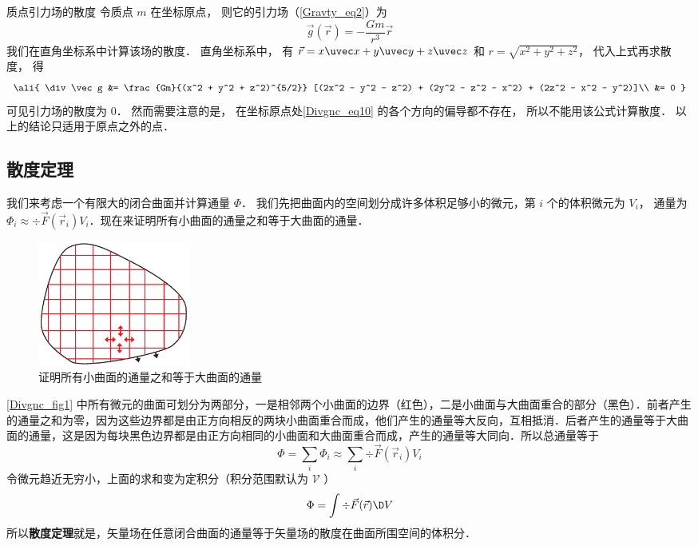 \begin{exam}{质点引力场的散度}
令质点 $m$ 在坐标原点， 则它的引力场（\autoref{Gravty_eq2}）为
\begin{equation}\label{Divgnc_eq10}
\vec g(\vec r) = -\frac{Gm}{r^3}\vec r
\end{equation}
我们在直角坐标系中计算该场的散度． 直角坐标系中， 有 $\vec r = x\uvec x + y\uvec y + z\uvec z$ 和 $r = \sqrt{x^2 + y^2 + z^2}$， 代入上式再求散度， 得
\begin{equation}\ali{
\div \vec g &= \frac{Gm}{(x^2 + y^2 + z^2)^{5/2}} [(2x^2 - y^2 - z^2) + (2y^2 - z^2 - x^2) + (2z^2 - x^2 - y^2)]\\
&= 0
}\end{equation}
可见引力场的散度为 0． 然而需要注意的是， 在坐标原点处\autoref{Divgnc_eq10} 的各个方向的偏导都不存在， 所以不能用该公式计算散度． 以上的结论只适用于原点之外的点．
\end{exam}


\subsection{散度定理}

我们来考虑一个有限大的闭合曲面并计算通量 $\Phi$． 我们先把曲面内的空间划分成许多体积足够小的微元，第 $i$ 个的体积微元为 $V_i$， 通量为 ${\Phi _i} \approx \div \vec F({\vec r_i}){V_i}$．现在来证明所有小曲面的通量之和等于大曲面的通量．
\begin{figure}[ht]
\centering
\includegraphics[width=5cm]{./figures/Divgnc.pdf}
\caption{证明所有小曲面的通量之和等于大曲面的通量} \label{Divgnc_fig1}
\end{figure}
\autoref{Divgnc_fig1} 中所有微元的曲面可划分为两部分，一是相邻两个小曲面的边界（红色），二是小曲面与大曲面重合的部分（黑色）．前者产生的通量之和为零，因为这些边界都是由正方向相反的两块小曲面重合而成，他们产生的通量等大反向，互相抵消．后者产生的通量等于大曲面的通量，这是因为每块黑色边界都是由正方向相同的小曲面和大曲面重合而成，产生的通量等大同向．所以总通量等于
\begin{equation}
\Phi  = \sum\limits_i {{\Phi _i}}  \approx \sum\limits_i {\div \vec F ({{\vec r}_i}){V_i}} 
\end{equation}
令微元趋近无穷小，上面的求和变为定积分（积分范围默认为 $\mathcal V$ ）
\begin{equation}
\Phi  = \int {\div \vec F(\vec r)\D V}
\end{equation}
所以\textbf{散度定理}就是，矢量场在任意闭合曲面的通量等于矢量场的散度在曲面所围空间的体积分．



